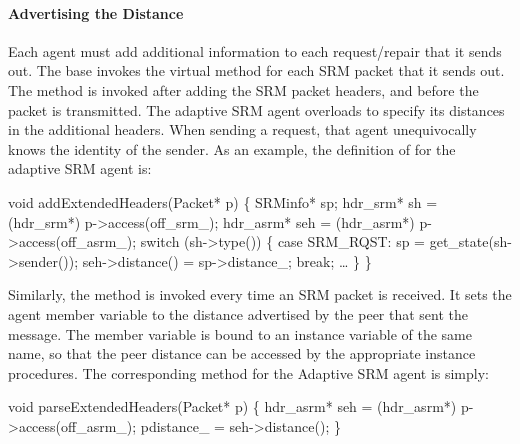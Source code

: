 \paragraph{Advertising the Distance}
Each agent must add additional information to each request/repair
that it sends out.
The base 
invokes the virtual method
for each SRM packet that it sends out.
The method is invoked after adding the SRM packet headers, and
before the packet is transmitted.
The adaptive SRM agent overloads 
to specify its distances in the additional headers.
When sending a request, that agent unequivocally knows the
identity of the sender.
As an example, the definition of
 for the adaptive SRM agent is:
\begin{program}
        void addExtendedHeaders(Packet* p) \{
                SRMinfo* sp;
                hdr_srm*  sh = (hdr_srm*) p->access(off_srm_);
                hdr_asrm* seh = (hdr_asrm*) p->access(off_asrm_);
                switch (sh->type()) \{
                case SRM_RQST:
                        sp = get_state(sh->sender());
                        seh->distance() = sp->distance_;
                        break;
                \ldots
                \}
        \}
\end{program}


Similarly, the method
is invoked every time an SRM packet is received.
It sets the agent member variable 
to the distance advertised by the peer that sent the message.
The member variable is bound to an instance variable of the same name,
so that the peer distance can be accessed
by the appropriate instance procedures.
The corresponding  method for the
Adaptive SRM agent is simply:
\begin{program}
        void parseExtendedHeaders(Packet* p) \{
                hdr_asrm* seh = (hdr_asrm*) p->access(off_asrm_);
                pdistance_ = seh->distance();
        \}
\end{program}


